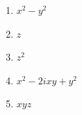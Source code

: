 \documentclass[fleqn]{article}
\begin{document}
\begin{enumerate}
      \begin{enumerate}
      
        \item $x^{2}-y^{2}$
        
        \item $z$
        
        \item $z^{2}$
        
        \item $x^{2}-2ixy+y^{2}$
        
        \item $xyz$
      \end{enumerate}
    
  \end{enumerate}

  \pagebreak
\end{document}

